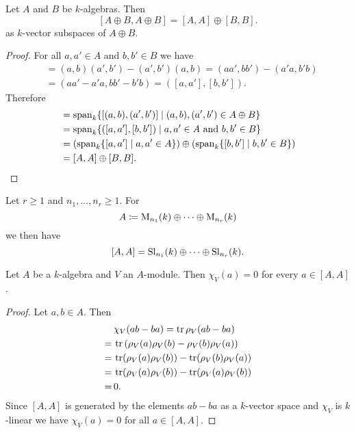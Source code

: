 \begin{lem}
 Let $A$ and $B$ be $k$-algebras. Then
 \[
  [A \oplus B, A \oplus B] = [A,A] \oplus [B,B].
 \]
 as $k$-vector subspaces of $A \oplus B$.
\end{lem}
\begin{proof}
 For all $a, a' \in A$ and $b, b' \in B$ we have
 \begin{align*}
  [(a,b),(a',b')]
  &= (a,b)(a',b') - (a',b')(a,b)
  = (aa',bb') - (a'a, b'b) \\
  &= (aa'-a'a, bb' - b'b)
  = ([a,a'], [b,b']).
 \end{align*}
 Therefore
 \begin{align*}
  [A \oplus B, A \oplus B]
  &= \vspan_k \{ [(a,b), (a',b')] \mid (a,b), (a',b') \in A \oplus B \} \\
  &= \vspan_k \{ ([a,a'], [b,b']) \mid a, a' \in A \text{ and } b, b' \in B \} \\
  &= \left( \vspan_k \{[a,a'] \mid a,a' \in A\} \right) \oplus \left( \vspan_k \{[b,b'] \mid b,b' \in B\} \right) \\
  &= [A,A] \oplus [B,B].
  \qedhere
 \end{align*}
\end{proof}


\begin{cor}\label{cor: commutator product of matrix algebras}
 Let $r \geq 1$ and $n_1, \dots, n_r \geq 1$. For
 \[
  A \coloneqq \operatorname{M}_{n_1}(k) \oplus \dotsb \oplus \operatorname{M}_{n_r}(k)
 \]
 we then have
 \[
  [A,A]
  = \operatorname{Sl}_{n_1}(k) \oplus \dotsb \oplus \operatorname{Sl}_{n_r}(k).
 \]
\end{cor}


\begin{lem}
 Let $A$ be a $k$-algebra and $V$ an $A$-module. Then $\chi_V(a) = 0$ for every $a \in [A,A]$.
\end{lem}
\begin{proof}
 Let $a, b \in A$. Then
 \begin{align*}
   &\, \chi_V(ab-ba)
  =    \operatorname{tr} \rho_V(ab-ba) \\
  =&\, \operatorname{tr}\left( \rho_V(a)\rho_V(b)-\rho_V(b)\rho_V(a) \right) \\
  =&\, \operatorname{tr}(\rho_V(a)\rho_V(b)) - \operatorname{tr}(\rho_V(b)\rho_V(a)) \\
  =&\, \operatorname{tr}(\rho_V(a)\rho_V(b)) - \operatorname{tr}(\rho_V(a)\rho_V(b)) \\
  =&\, 0.
 \end{align*}
 Since $[A,A]$ is generated by the elements $ab-ba$ as a $k$-vector space and $\chi_V$ is $k$-linear we have $\chi_V(a) = 0$ for all $a \in [A,A]$.
\end{proof}


